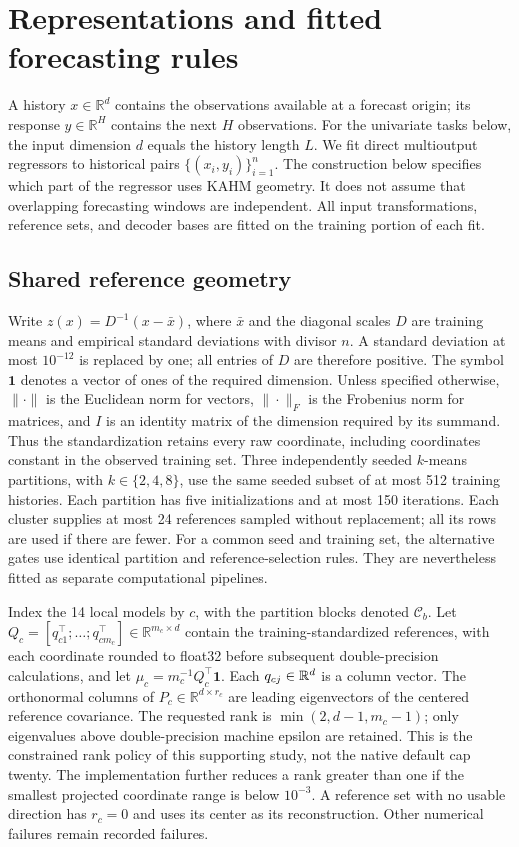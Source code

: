 \section{Representations and fitted forecasting rules}
\label{sec:nf-methods}

A history $x\in\mathbb R^d$ contains the observations available at a forecast
origin; its response $y\in\mathbb R^H$ contains the next $H$ observations.
For the univariate tasks below, the input dimension $d$ equals the history length $L$.
We fit direct multioutput regressors to historical pairs
$\{(x_i,y_i)\}_{i=1}^n$.  The construction below specifies which part of the
regressor uses KAHM geometry.  It does not assume that overlapping forecasting
windows are independent.  All input transformations, reference sets, and
decoder bases are fitted on the training portion of each fit.

\subsection{Shared reference geometry}
\label{sec:nf-reference-geometry}

Write $z(x)=D^{-1}(x-\bar x)$, where $\bar x$ and the diagonal scales $D$ are
training means and empirical standard deviations with divisor $n$.  A standard deviation at
most $10^{-12}$ is replaced by one; all entries of $D$ are therefore positive. The symbol $\mathbf1$
denotes a vector of ones of the required dimension. Unless specified
otherwise, $\|\cdot\|$ is the Euclidean norm for vectors,
$\|\cdot\|_F$ is the Frobenius norm for matrices, and $I$ is an
identity matrix of the dimension required by its summand. Thus the
standardization retains every
raw coordinate, including coordinates constant in the observed training set.
Three independently seeded $k$-means partitions, with $k\in\{2,4,8\}$, use
the same seeded subset of at most 512 training histories.  Each partition has
five initializations and at most 150 iterations.  Each cluster supplies at
most 24 references sampled without replacement; all its rows are used if
there are fewer.  For a common seed and training set, the alternative gates
use identical partition and reference-selection rules.  They are nevertheless
fitted as separate computational pipelines.

Index the 14 local models by $c$, with the partition blocks denoted
$\mathcal C_b$.  Let
$Q_c=[q_{c1}^\top;\ldots;q_{cm_c}^\top]\in\mathbb R^{m_c\times d}$ contain the
training-standardized references, with each coordinate rounded to float32
before subsequent double-precision calculations, and let $\mu_c=m_c^{-1}Q_c^\top\mathbf 1$.
Each $q_{cj}\in\mathbb{R}^d$ is a column vector. The orthonormal columns of $P_c\in\mathbb R^{d\times r_c}$ are leading
eigenvectors of the centered reference covariance.  The requested rank is
$\min(2,d-1,m_c-1)$; only eigenvalues above double-precision machine epsilon
are retained. This is the constrained rank policy of this supporting
study, not the native default cap twenty. The implementation further reduces a rank greater
than one if the smallest projected coordinate range is below $10^{-3}$.
A reference set with no usable direction has $r_c=0$ and uses its center as
its reconstruction.  Other numerical failures remain recorded failures.

